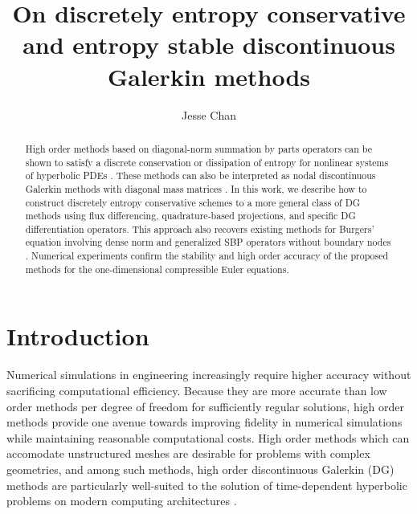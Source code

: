 \documentclass[preprint,10pt]{elsarticle}
\theoremstyle{definition}
\theoremstyle{lemma}
\theoremstyle{theorem}
\theoremstyle{assumption}
\begin{document}

\begin{frontmatter}
\title{On discretely entropy conservative and entropy stable discontinuous Galerkin methods}

\author[rice]{Jesse Chan}
\address[rice]{Department of Computational and Applied Mathematics, Rice University, 6100 Main St, Houston, TX, 77005}

\begin{abstract}
High order methods based on diagonal-norm summation by parts operators can be shown to satisfy a discrete conservation or dissipation of entropy for nonlinear systems of hyperbolic PDEs \cite{fisher2013high, carpenter2014entropy}.  These methods can also be interpreted as nodal discontinuous Galerkin methods with diagonal mass matrices \cite{gassner2016split, gassner2016well, wintermeyer2017entropy, chen2017entropy}.  In this work, we describe how to construct discretely entropy conservative schemes to a more general class of DG methods using flux differencing, quadrature-based projections, and specific DG differentiation operators.  This approach also recovers existing methods for Burgers' equation involving dense norm and generalized SBP operators without boundary nodes \cite{fernandez2014generalized, ranocha2016summation, ranocha2017extended}.  Numerical experiments confirm the stability and high order accuracy of the proposed methods for the one-dimensional compressible Euler equations.  
\end{abstract}
\end{frontmatter}


\section{Introduction}

Numerical simulations in engineering increasingly require higher accuracy without sacrificing computational efficiency.  Because they are more accurate than low order methods per degree of freedom for sufficiently regular solutions, high order methods provide one avenue towards improving fidelity in numerical simulations while maintaining reasonable computational costs.  High order methods which can accomodate unstructured meshes are desirable for problems with complex geometries, and among such methods, high order discontinuous Galerkin (DG) methods are particularly well-suited to the solution of time-dependent hyperbolic problems on modern computing architectures \cite{hesthaven2007nodal, klockner2009nodal}.  
\end{document}
